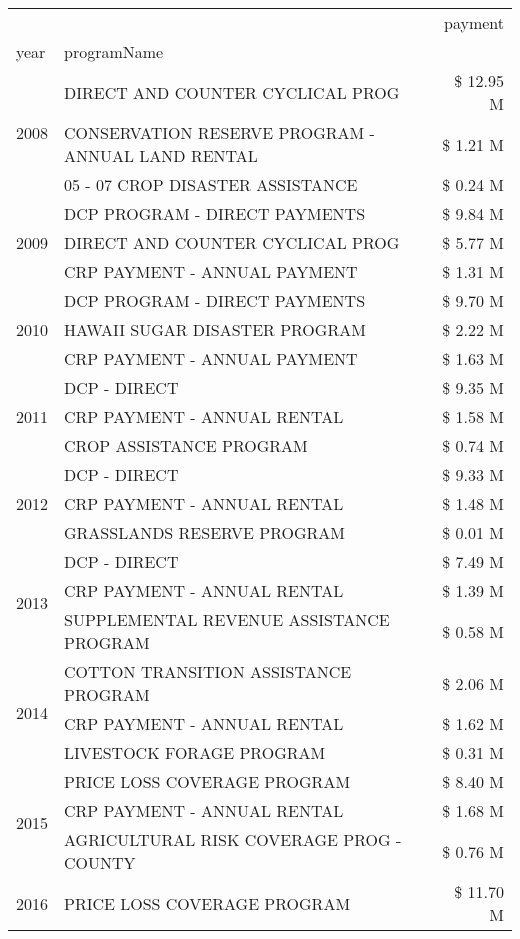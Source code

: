 \begin{tabular}{llr}
\toprule
 &  & payment \\
year & programName &  \\
\midrule
\multirow[t]{3}{*}{2008} & DIRECT AND COUNTER CYCLICAL PROG & \$ 12.95 M \\
 & CONSERVATION RESERVE PROGRAM - ANNUAL LAND RENTAL & \$ 1.21 M \\
 & 05 - 07 CROP DISASTER ASSISTANCE & \$ 0.24 M \\
\cline{1-3}
\multirow[t]{3}{*}{2009} & DCP PROGRAM - DIRECT PAYMENTS & \$ 9.84 M \\
 & DIRECT AND COUNTER CYCLICAL PROG & \$ 5.77 M \\
 & CRP PAYMENT - ANNUAL PAYMENT & \$ 1.31 M \\
\cline{1-3}
\multirow[t]{3}{*}{2010} & DCP PROGRAM - DIRECT PAYMENTS & \$ 9.70 M \\
 & HAWAII SUGAR DISASTER PROGRAM & \$ 2.22 M \\
 & CRP PAYMENT - ANNUAL PAYMENT & \$ 1.63 M \\
\cline{1-3}
\multirow[t]{3}{*}{2011} & DCP - DIRECT & \$ 9.35 M \\
 & CRP PAYMENT - ANNUAL RENTAL & \$ 1.58 M \\
 & CROP ASSISTANCE PROGRAM & \$ 0.74 M \\
\cline{1-3}
\multirow[t]{3}{*}{2012} & DCP - DIRECT & \$ 9.33 M \\
 & CRP PAYMENT - ANNUAL RENTAL & \$ 1.48 M \\
 & GRASSLANDS RESERVE PROGRAM & \$ 0.01 M \\
\cline{1-3}
\multirow[t]{3}{*}{2013} & DCP - DIRECT & \$ 7.49 M \\
 & CRP PAYMENT - ANNUAL RENTAL & \$ 1.39 M \\
 & SUPPLEMENTAL REVENUE ASSISTANCE PROGRAM & \$ 0.58 M \\
\cline{1-3}
\multirow[t]{3}{*}{2014} & COTTON TRANSITION ASSISTANCE PROGRAM & \$ 2.06 M \\
 & CRP PAYMENT - ANNUAL RENTAL & \$ 1.62 M \\
 & LIVESTOCK FORAGE PROGRAM & \$ 0.31 M \\
\cline{1-3}
\multirow[t]{3}{*}{2015} & PRICE LOSS COVERAGE PROGRAM & \$ 8.40 M \\
 & CRP PAYMENT - ANNUAL RENTAL & \$ 1.68 M \\
 & AGRICULTURAL RISK COVERAGE PROG - COUNTY & \$ 0.76 M \\
\cline{1-3}
\multirow[t]{3}{*}{2016} & PRICE LOSS COVERAGE PROGRAM                   & \$ 11.70 M \\

\end{tabular}
